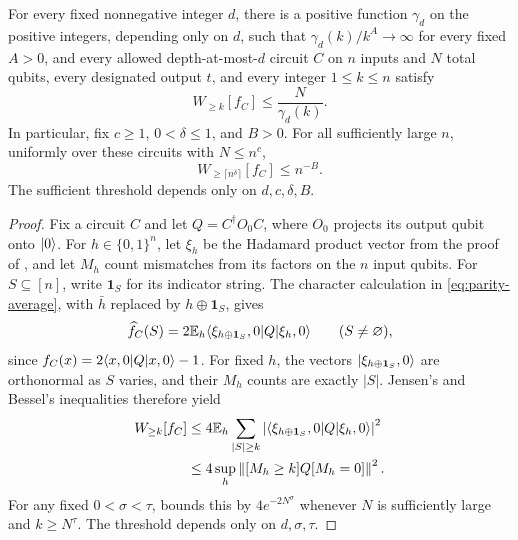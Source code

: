 \begin{corollary}
\label{cor:quantum-lmn}
For every fixed nonnegative integer $d$, there is a positive function
$\gamma_d$ on the positive integers, depending only on $d$, such that
$\gamma_d(k)/k^A\to\infty$ for every fixed $A>0$, and every allowed
depth-at-most-$d$ circuit $C$ on $n$ inputs and $N$ total qubits,
every designated output $t$, and every integer $1\le k\le n$ satisfy
\[
 W_{\ge k}[f_C]\le\frac{N}{\gamma_d(k)}.
\]
In particular, fix $c\ge1$, $0<\delta\le1$, and $B>0$. For all
sufficiently large $n$, uniformly over these circuits with $N\le n^c$,
\[
 W_{\ge\lceil n^\delta\rceil}[f_C]\le n^{-B}.
\]
The sufficient threshold depends only on $d,c,\delta,B$.
\end{corollary}

\begin{proof}
Fix a circuit $C$ and let $Q=C^\dagger O_0C$, where $O_0$ projects its
output qubit onto $\lvert 0\rangle$. For $h\in\{0,1\}^n$, let $\xi_h$ be the
Hadamard product vector from the proof of , and let
$M_h$ count mismatches from its factors on the $n$ input qubits.
For $S\subseteq[n]$, write $\mathbf 1_S$ for its indicator string.
The character calculation in \eqref{eq:parity-average}, with
$\bar h$ replaced by $h\oplus\mathbf 1_S$, gives
\[
 \widehat f_C(S)
 =2\mathbb E_h\langle \xi_{h\oplus\mathbf 1_S},0\rvert Q\lvert \xi_h,0\rangle
 \qquad(S\ne\varnothing),
\]
since $f_C(x)=2\langle x,0\rvert Q\lvert x,0\rangle-1$.
For fixed $h$, the vectors $\lvert \xi_{h\oplus\mathbf 1_S},0\rangle$ are
orthonormal as $S$ varies, and their $M_h$ counts are exactly $|S|$.
Jensen's and Bessel's inequalities therefore yield
\begin{align}
 W_{\ge k}[f_C]
 &\le4\mathbb E_h\sum_{|S|\ge k}
   \left|\langle \xi_{h\oplus\mathbf 1_S},0\rvert Q\lvert \xi_h,0\rangle\right|^2
   \notag\\
 &\le4\sup_h\left\lVert [M_h\ge k]Q[M_h=0]\right\rVert^2.
 \label{eq:fourier-localization}
\end{align}
For any fixed $0<\sigma<\tau$,  bounds this
by $4e^{-2N^\sigma}$ whenever $N$ is sufficiently large and
$k\ge N^\tau$. The threshold depends only on $d,\sigma,\tau$.


\end{proof}
